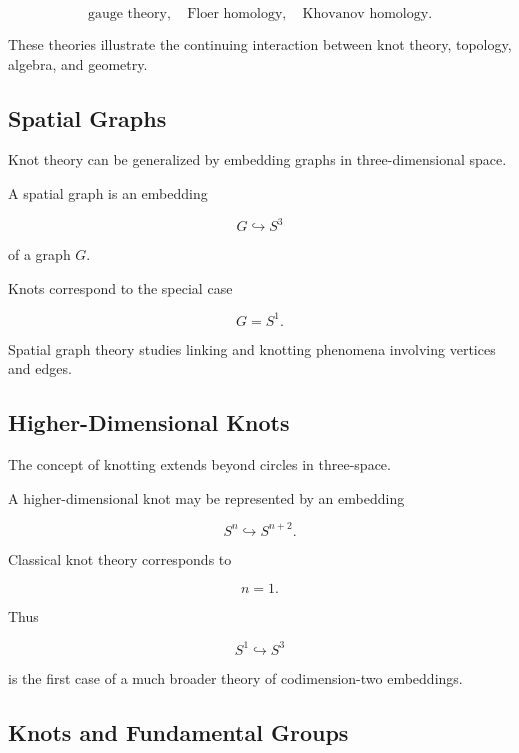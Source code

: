 \[
\boxed{
\text{gauge theory},
\quad
\text{Floer homology},
\quad
\text{Khovanov homology}.
}
\]

These theories illustrate the continuing interaction between knot theory,
topology, algebra, and geometry.

\subsection{Spatial Graphs}
\label{subsec:spatial-graphs}

Knot theory can be generalized by embedding graphs in three-dimensional
space.

A spatial graph is an embedding

\[
\boxed{
G\hookrightarrow S^3
}
\]

of a graph \(G\).

Knots correspond to the special case

\[
G=S^1.
\]

Spatial graph theory studies linking and knotting phenomena involving
vertices and edges.

\subsection{Higher-Dimensional Knots}
\label{subsec:higher-dimensional-knots}

The concept of knotting extends beyond circles in three-space.

A higher-dimensional knot may be represented by an embedding

\[
\boxed{
S^n\hookrightarrow S^{n+2}.
}
\]

Classical knot theory corresponds to

\[
n=1.
\]

Thus

\[
S^1\hookrightarrow S^3
\]

is the first case of a much broader theory of codimension-two embeddings.

\subsection{Knots and Fundamental Groups}
\label{subsec:knots-fundamental-groups}

